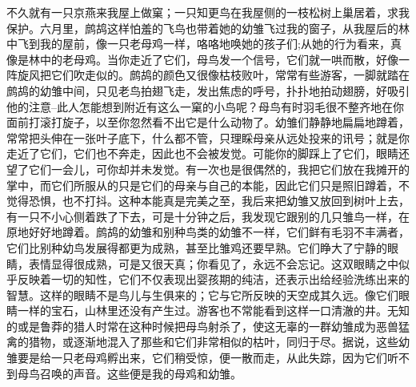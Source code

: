 {不久就有一只京燕来我屋上做窠；一只知更鸟在我屋侧的一枝松树上巢居着，求我保护。六月里，鹧鸪这样怕羞的飞鸟也带着她的幼雏飞过我的窗子，从我屋后的林中飞到我的屋前，像一只老母鸡一样，咯咯地唤她的孩子们;从她的行为看来，真像是林中的老母鸡。当你走近了它们，母鸟发一个信号，它们就一哄而散，好像一阵旋风把它们吹走似的。鹧鸪的颜色又很像枯枝败叶，常常有些游客，一脚就踏在鹧鸪的幼雏中间，只见老鸟拍翅飞走，发出焦虑的呼号，扑扑地拍动翅膀，好吸引他的注意--此人怎能想到附近有这么一窠的小鸟呢？母鸟有时羽毛很不整齐地在你面前打滚打旋子，以至你忽然看不出它是什么动物了。幼雏们静静地扁扁地蹲着，常常把头伸在一张叶子底下，什么都不管，只理睬母亲从远处投来的讯号；就是你走近了它们，它们也不奔走，因此也不会被发觉。可能你的脚踩上了它们，眼睛还望了它们一会儿，可你却并未发觉。有一次也是很偶然的，我把它们放在我摊开的掌中，而它们所服从的只是它们的母亲与自己的本能，因此它们只是照旧蹲着，不觉得恐惧，也不打抖。这种本能真是完美之至，我后来把幼雏又放回到树叶上去，有一只不小心侧着跌了下去，可是十分钟之后，我发现它跟别的几只雏鸟一样，在原地好好地蹲着。鹧鸪的幼雏和别种鸟类的幼雏不一样，它们鲜有毛羽不丰满者，它们比别种幼鸟发展得都更为成熟，甚至比雏鸡还要早熟。它们睁大了宁静的眼睛，表情显得很成熟，可是又很天真；你看见了，永远不会忘记。这双眼睛之中似乎反映着一切的知性，它们不仅表现出婴孩期的纯洁，还表示出给经验洗练出来的智慧。这样的眼睛不是鸟儿与生俱来的；它与它所反映的天空成其久远。像它们眼睛一样的宝石，山林里还没有产生过。游客也不常能看到这样一口清澈的井。无知的或是鲁莽的猎人时常在这种时候把母鸟射杀了，使这无辜的一群幼雏成为恶兽猛禽的猎物，或逐渐地混入了那些和它们非常相似的枯叶，同归于尽。据说，这些幼雏要是给一只老母鸡孵出来，它们稍受惊，便一散而走，从此失踪，因为它们听不到母鸟召唤的声音。这些便是我的母鸡和幼雏。

}